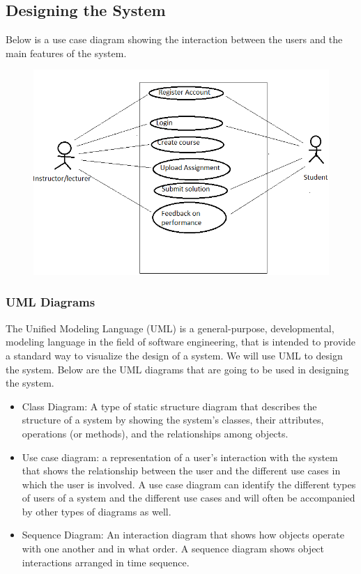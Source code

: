 \documentclass[12pt]{article}
\begin{document}
	\subsection{Designing the  System}
		Below is a use case diagram showing the interaction between the users and the main features of the system.
		
		\begin{figure}[H]
			\begin{center} \includegraphics[width=1\linewidth]{usecase.PNG} \end{center}
		\end{figure}

		\subsubsection{UML Diagrams}
		The Unified Modeling Language (UML) is a general-purpose, developmental, modeling language in the field of software engineering, that is intended to provide a standard way to visualize the design of a system. We will use UML to design the system. Below are the UML diagrams that are going to be used in designing the system.
			\begin{itemize}
				\item Class Diagram: A type of static structure diagram that describes the structure of a system by showing the system's classes, their attributes, operations (or methods), and the relationships among objects.
				\item Use case diagram: a representation of a user's interaction with the system that shows the relationship between the user and the different use cases in which the user is involved. A use case diagram can identify the different types of users of a system and the different use cases and will often be accompanied by other types of diagrams as well.
				\item Sequence Diagram: An interaction diagram that shows how objects operate with one another and in what order. A sequence diagram shows object interactions arranged in time sequence.
			\end{itemize}
	
\end{document}
